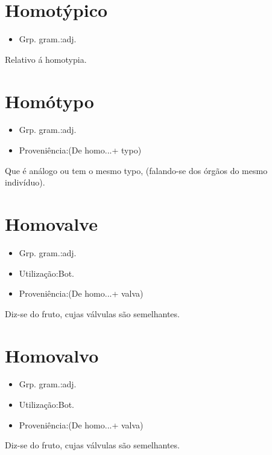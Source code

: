 \documentclass{article}
\begin{document}
\section{Homotýpico}
\begin{itemize}
\item {Grp. gram.:adj.}
\end{itemize}
Relativo á homotypia.
\section{Homótypo}
\begin{itemize}
\item {Grp. gram.:adj.}
\end{itemize}
\begin{itemize}
\item {Proveniência:(De \textunderscore homo...\textunderscore  + \textunderscore typo\textunderscore )}
\end{itemize}
Que é análogo ou tem o mesmo typo, (falando-se dos órgãos do mesmo indivíduo).
\section{Homovalve}
\begin{itemize}
\item {Grp. gram.:adj.}
\end{itemize}
\begin{itemize}
\item {Utilização:Bot.}
\end{itemize}
\begin{itemize}
\item {Proveniência:(De \textunderscore homo...\textunderscore  + \textunderscore valva\textunderscore )}
\end{itemize}
Diz-se do fruto, cujas válvulas são semelhantes.
\section{Homovalvo}
\begin{itemize}
\item {Grp. gram.:adj.}
\end{itemize}
\begin{itemize}
\item {Utilização:Bot.}
\end{itemize}
\begin{itemize}
\item {Proveniência:(De \textunderscore homo...\textunderscore  + \textunderscore valva\textunderscore )}
\end{itemize}
Diz-se do fruto, cujas válvulas são semelhantes.
\end{document}
